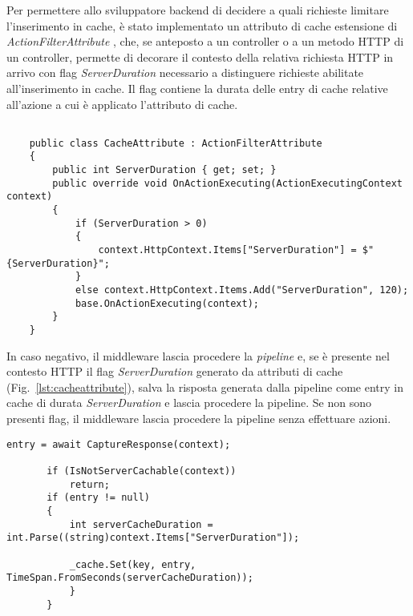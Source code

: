 Per permettere allo sviluppatore backend di decidere a quali richieste limitare l'inserimento in cache, è stato implementato un attributo di cache estensione di \\ \textit{ActionFilterAttribute} \cite{ACTIONFILTER}, che, se anteposto a un controller o a un metodo HTTP di un controller, permette di decorare il contesto della relativa richiesta HTTP \cite{HTTPCONTEXT} in arrivo con flag \textit{ServerDuration} necessario a distinguere richieste abilitate all'inserimento in cache.
Il flag contiene la durata delle entry di cache relative all'azione a cui è applicato l'attributo di cache.

\begin{lstlisting}[caption={CacheAttribute.cs}, style=javaScriptCode, label={lst:cacheattribute}]

    public class CacheAttribute : ActionFilterAttribute
    {
        public int ServerDuration { get; set; }
        public override void OnActionExecuting(ActionExecutingContext context)
        {
            if (ServerDuration > 0)
            {
                context.HttpContext.Items["ServerDuration"] = $"{ServerDuration}";
            }
            else context.HttpContext.Items.Add("ServerDuration", 120);
            base.OnActionExecuting(context);
        }
    }
\end{lstlisting}

In caso negativo, il middleware lascia procedere la \textit{pipeline} e, se è presente nel contesto HTTP \cite{HTTPCONTEXT} il flag \textit{ServerDuration} generato da attributi di cache \cite{ACTIONFILTER} (Fig.~\ref{lst:cacheattribute}), salva la risposta generata dalla pipeline come entry in cache di durata \textit{ServerDuration} e lascia procedere la pipeline. Se non sono presenti flag, il middleware lascia procedere la pipeline senza effettuare azioni.

\begin{lstlisting}[caption={TotallyOriginalCachingMiddleware.cs, Cache miss scenario}, style=javaScriptCode]
entry = await CaptureResponse(context);

       if (IsNotServerCachable(context))
           return;
       if (entry != null)
       {
           int serverCacheDuration = int.Parse((string)context.Items["ServerDuration"]);

           _cache.Set(key, entry, TimeSpan.FromSeconds(serverCacheDuration));
           }
       }
\end{lstlisting}
